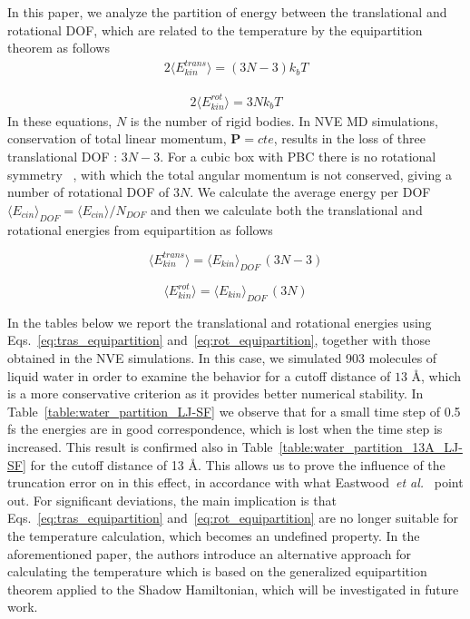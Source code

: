 \documentclass[aip,jcp,reprint,amsmath,amssymb,raggedbottom]{revtex4-1}
\begin{document}
In this paper, we analyze the partition of energy between the translational and rotational DOF, which are related to the temperature by the equipartition theorem as follows
\begin{align}
\label{eq:tras_equipartition}
2 \langle E_{kin}^{trans} \rangle = (3N - 3) k_b T
\end{align}

\begin{align}
\label{eq:rot_equipartition}
2 \langle E_{kin}^{rot} \rangle = 3N k_b T
\end{align} 
In these equations, $N$ is the number of rigid bodies. In NVE MD simulations, conservation of total linear momentum, $ \boldsymbol{P}= cte $, results in the loss of three translational DOF : $ 3N-3 $. For a cubic box with PBC there is no rotational symmetry ~\cite{Frenkel_2013,Kuzkin_2014}, with which the total angular momentum is not conserved, giving a number of rotational DOF of $3N$.  We calculate the average energy per DOF $ \langle E_{cin} \rangle_{DOF} = \langle E_{cin} \rangle /N_{DOF}$ and then we calculate both the translational and rotational energies from equipartition as follows

\begin{equation}
\langle E_{kin}^{trans}\rangle =  \langle E_{kin} \rangle_{DOF} \, (3N-3)
\end{equation}

\begin{equation}
\langle E_{kin}^{rot} \rangle =  \langle E_{kin} \rangle_{DOF} \, (3N)
\end{equation}


In the tables below we report the translational and rotational energies using Eqs.~\ref{eq:tras_equipartition} and~\ref{eq:rot_equipartition}, together with those obtained in the NVE simulations. In this case, we simulated 903 molecules of liquid water in order to examine the behavior for a cutoff distance of $13$ {\AA}, which is a more conservative criterion as it provides better numerical stability. In Table~\ref{table:water_partition_LJ-SF} we observe that for a small time step of 0.5 fs the energies are in good correspondence, which is lost when the time step is increased. This result is confirmed also in Table~\ref{table:water_partition_13A_LJ-SF} for the cutoff distance of 13 {\AA}. This allows us to prove the influence of the truncation error on in this effect, in accordance with what Eastwood~\textit{et al.}~\cite{Eastwood_2010} point out. For significant deviations, the main implication is that Eqs.~\ref{eq:tras_equipartition} and~\ref{eq:rot_equipartition} are no longer suitable for the temperature calculation, which becomes an undefined property. In the aforementioned paper, the authors introduce an alternative approach for calculating the temperature which is based on the generalized equipartition theorem applied to the Shadow Hamiltonian, which will be investigated in future work.
\end{document}

